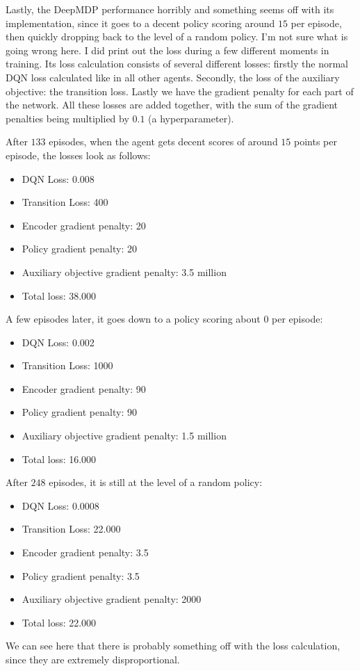 Lastly, the DeepMDP performance horribly and something seems off with its implementation, since it goes to a decent policy scoring around $15$ per episode, then quickly dropping back to the level of a random policy. I'm not sure what is going wrong here. I did print out the loss during a few different moments in training. Its loss calculation consists of several different losses: firstly the normal DQN loss calculated like in all other agents. Secondly, the loss of the auxiliary objective: the transition loss. Lastly we have the gradient penalty for each part of the network. All these losses are added together, with the sum of the gradient penalties being multiplied by $0.1$ (a hyperparameter).

After $133$ episodes, when the agent gets decent scores of around $15$ points per episode, the losses look as follows:
\begin{itemize}
\item DQN Loss: 0.008
\item Transition Loss: 400
\item Encoder gradient penalty: 20
\item Policy gradient penalty: 20
\item Auxiliary objective gradient penalty: 3.5 million
\item Total loss: 38.000
\end{itemize}

A few episodes later, it goes down to a policy scoring about $0$ per episode:
\begin{itemize}
\item DQN Loss: 0.002
\item Transition Loss: 1000
\item Encoder gradient penalty: 90
\item Policy gradient penalty: 90
\item Auxiliary objective gradient penalty: 1.5 million
\item Total loss: 16.000
\end{itemize}

After $248$ episodes, it is still at the level of a random policy:
\begin{itemize}
\item DQN Loss: 0.0008 
\item Transition Loss: 22.000
\item Encoder gradient penalty: 3.5
\item Policy gradient penalty: 3.5
\item Auxiliary objective gradient penalty: 2000
\item Total loss: 22.000
\end{itemize}

We can see here that there is probably something off with the loss calculation, since they are extremely disproportional.